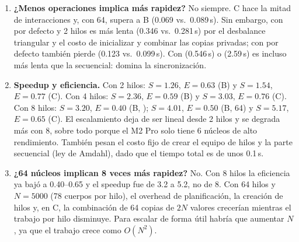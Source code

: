 \begin{enumerate}[leftmargin=*,label=\textbf{\arabic*.}]
\item \textbf{¿Menos operaciones implica más rapidez?} No siempre. C hace la mitad de interacciones y,
con  64, supera a B (0.069 vs.\ 0.089\,s). Sin embargo, con  por defecto y
2 hilos es más lenta (0.346 vs.\ 0.281\,s) por el desbalance triangular y el costo de inicializar y
combinar las copias privadas; con  por defecto también pierde (0.123 vs.\ 0.099\,s). Con
 (0.546\,s) o  (2.59\,s) es incluso más lenta que la secuencial: domina la
sincronización.

\item \textbf{Speedup y eficiencia.} Con 2 hilos: $S = 1.26$, $E = 0.63$ (B) y $S = 1.54$,
$E = 0.77$ (C). Con 4 hilos: $S = 2.36$, $E = 0.59$ (B) y $S = 3.03$, $E = 0.76$ (C). Con 8 hilos:
$S = 3.20$, $E = 0.40$ (B, ); $S = 4.01$, $E = 0.50$ (B,  64) y
$S = 5.17$, $E = 0.65$ (C). El escalamiento deja de ser lineal desde 2 hilos y se degrada más con 8,
sobre todo porque el M2 Pro solo tiene 6 núcleos de alto rendimiento. También pesan el costo fijo de
crear el equipo de hilos y la parte secuencial (ley de Amdahl), dado que el tiempo total es de unos
0.1\,s.

\item \textbf{¿64 núcleos implican 8 veces más rapidez?} No. Con 8 hilos la eficiencia ya bajó a
0.40--0.65 y el speedup fue de 3.2 a 5.2, no de 8. Con 64 hilos y $N = 5000$ (78 cuerpos por hilo),
el overhead de planificación, la creación de hilos y, en C, la combinación de 64 copias de $2N$
valores crecerían mientras el trabajo por hilo disminuye. Para escalar de forma útil habría que
aumentar $N$, ya que el trabajo crece como $O(N^2)$.
\end{enumerate}
